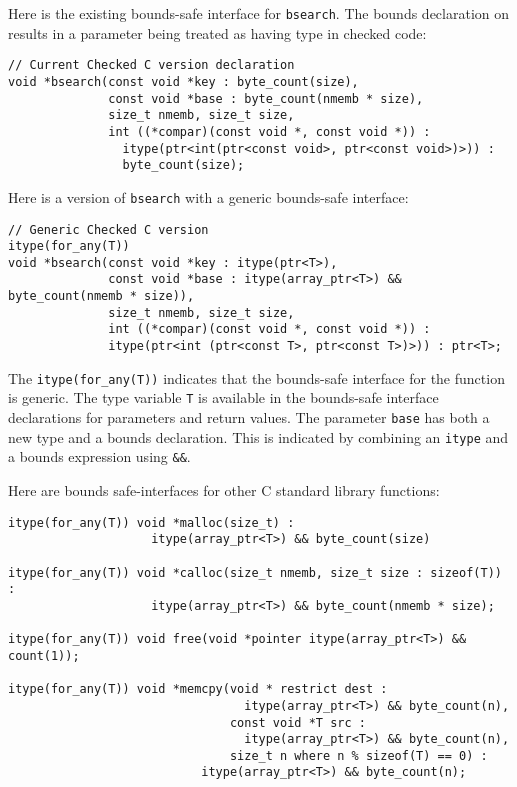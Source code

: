 Here is the existing bounds-safe interface for \lstinline+bsearch+. 
The bounds declaration on \uncheckedptrvoid{} results in a parameter being
treated as having type \arrayptrvoid{} in checked code:
\begin{lstlisting} 
// Current Checked C version declaration
void *bsearch(const void *key : byte_count(size),
              const void *base : byte_count(nmemb * size),
              size_t nmemb, size_t size,
              int ((*compar)(const void *, const void *)) :
                itype(ptr<int(ptr<const void>, ptr<const void>)>)) :
                byte_count(size);
\end{lstlisting}
Here is a version of \lstinline+bsearch+ with a generic bounds-safe interface:
\begin{lstlisting}
// Generic Checked C version
itype(for_any(T)) 
void *bsearch(const void *key : itype(ptr<T>),
              const void *base : itype(array_ptr<T>) && byte_count(nmemb * size)),
              size_t nmemb, size_t size,
              int ((*compar)(const void *, const void *)) :
              itype(ptr<int (ptr<const T>, ptr<const T>)>)) : ptr<T>;
\end{lstlisting}
The \lstinline+itype(for_any(T))+ indicates that the bounds-safe interface for
the function is generic.  The type variable \lstinline+T+ is available in the
bounds-safe interface declarations for parameters and return values.  The parameter 
\lstinline+base+ has both a new type and a bounds declaration.  This is indicated
by combining an \lstinline+itype+ and a bounds expression using \lstinline+&&+.

Here are bounds safe-interfaces for other C standard library
functions:
\begin{lstlisting}
itype(for_any(T)) void *malloc(size_t) : 
                    itype(array_ptr<T>) && byte_count(size)

itype(for_any(T)) void *calloc(size_t nmemb, size_t size : sizeof(T)) : 
                    itype(array_ptr<T>) && byte_count(nmemb * size);

itype(for_any(T)) void free(void *pointer itype(array_ptr<T>) && count(1));

itype(for_any(T)) void *memcpy(void * restrict dest : 
                                 itype(array_ptr<T>) && byte_count(n),
                               const void *T src : 
                                 itype(array_ptr<T>) && byte_count(n), 
                               size_t n where n % sizeof(T) == 0) :
                           itype(array_ptr<T>) && byte_count(n);
\end{lstlisting}

